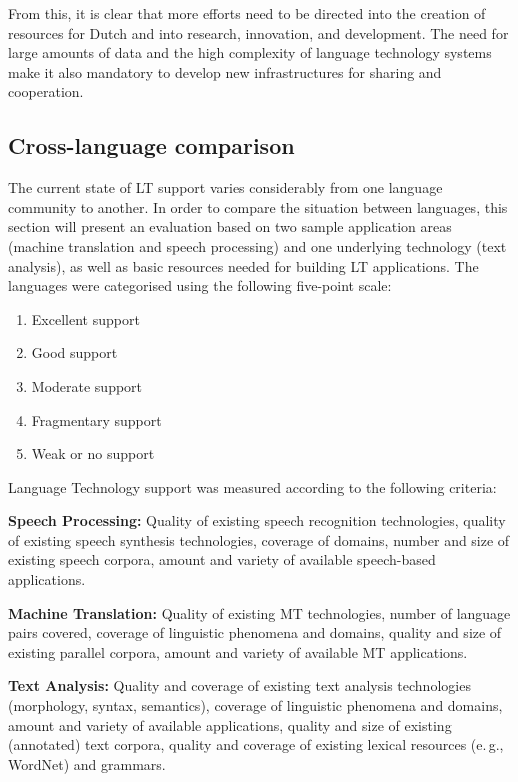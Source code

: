 \begin{multicols}{2}
From this, it is clear that more efforts need to be directed into the creation of resources for Dutch and into research, innovation, and development. The need for large amounts of data and the high complexity of language technology systems make it also mandatory to develop new infrastructures for sharing and cooperation.

\subsection{Cross-language comparison}

The current state of LT support varies considerably from one language community to another. In order to compare the situation between languages, this section will present an evaluation based on two sample application areas (machine translation and speech processing) and one underlying technology (text analysis), as well as basic resources needed for building LT applications. The languages were categorised using the following five-point scale:

\begin{enumerate}
\item Excellent support
\item Good support
\item Moderate support
\item Fragmentary support
\item Weak or no support
\end{enumerate}

Language Technology support was measured according to the following criteria:

\textbf{Speech Processing:} Quality of existing speech recognition technologies, quality of existing speech synthesis technologies, coverage of domains, number and size of existing speech corpora, amount and variety of available speech-based applications.

\textbf{Machine Translation:} Quality of existing MT technologies, number of language pairs covered, coverage of linguistic phenomena and domains, quality and size of existing parallel corpora, amount and variety of available MT applications.

\textbf{Text Analysis:} Quality and coverage of existing text analysis technologies (morphology, syntax, semantics), coverage of linguistic phenomena and domains, amount and variety of available applications, quality and size of existing (annotated) text corpora, quality and coverage of existing lexical resources (e.\,g., WordNet) and grammars.


\end{multicols}
